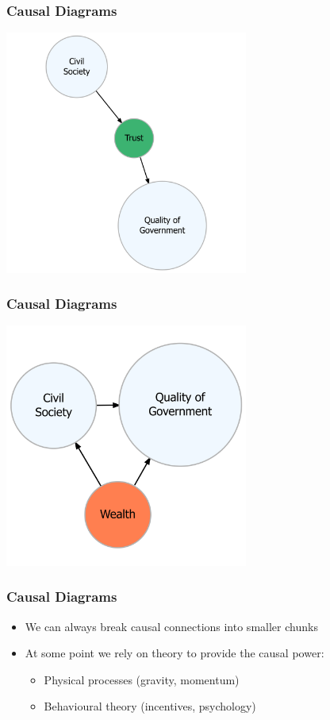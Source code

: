 \documentclass[xcolor=x11names,compress]{beamer}\usepackage[]{graphicx}\usepackage[]{xcolor}
\renewcommand{\(}{\begin{columns}}
\renewcommand{\)}{\end{columns}}
\newcommand{\<}[1]{\begin{column}{#1}}
\renewcommand{\>}{\end{column}}
\begin{document}
\begin{frame}
\frametitle{Causal Diagrams}

\includegraphics[width=0.6\textwidth]{graph2.png}
\end{frame}


\begin{frame}
\frametitle{Causal Diagrams}

\includegraphics[width=0.6\textwidth]{graph3.png}
\end{frame}

\begin{frame}
\frametitle{Causal Diagrams}
\begin{itemize}
\item We can always break causal connections into smaller chunks
\pause
\item At some point we rely on theory to provide the causal power:
\begin{itemize}
\item Physical processes (gravity, momentum)
\item Behavioural theory (incentives, psychology)
\end{itemize}
\end{itemize}
\end{frame}
\end{document}
